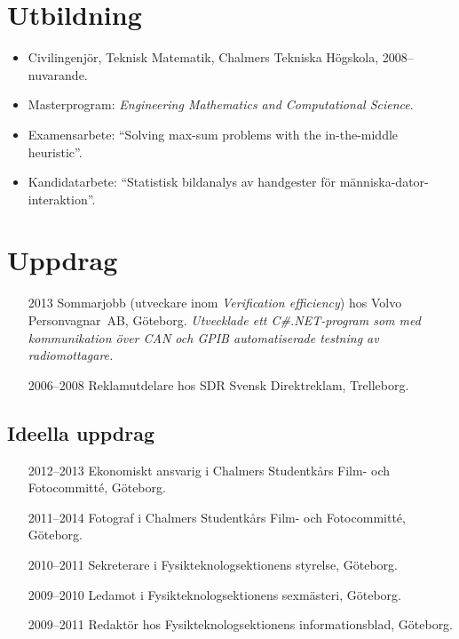 \documentclass{skvitae}
\begin{document}
	\RaggedRight
	\maketitle


	\section{Utbildning}
	\begin{itemize}
		\item Civilingenjör, Teknisk Matematik, Chalmers Tekniska Högskola, 2008--nuvarande.%
		\item Masterprogram: \emph{Engineering Mathematics and Computational Science}.%
		\item Examensarbete: \foreignquote{english}{Solving max-sum problems with the in-the-middle heuristic}.%
		\item Kandidatarbete: \enquote{Statistisk bildanalys av handgester för människa-dator-interaktion}.
	\end{itemize}

	\section{Uppdrag}
	\begin{itemize}
		\item[2013] Sommarjobb (utveckare inom \emph{Verification efficiency}) hos Volvo Person\-vagnar~AB, Göteborg. %
		    \textit{Utvecklade ett C\#.NET-program som med kommunikation över CAN och GPIB automatiserade testning av radiomottagare.}
		\item[2006--2008] Reklamutdelare hos SDR Svensk Direktreklam, Trelleborg.
	\end{itemize}

	\medskip
	\subsection{Ideella uppdrag}
	\begin{itemize}
		\item[2012--2013] Ekonomiskt ansvarig i Chalmers Studentkårs Film- och Fotocommitté, Göteborg.
		\item[2011--2014] Fotograf i Chalmers Studentkårs Film- och Fotocommitté, Göteborg.
		\item[2010--2011] Sekreterare i Fysikteknologsektionens styrelse, Göteborg.
		\item[2009--2010] Ledamot i Fysikteknologsektionens sexmästeri, Göteborg.
		\item[2009--2011] Redaktör hos Fysikteknologsektionens informationsblad, Göteborg.
	\end{itemize}
\end{document}
